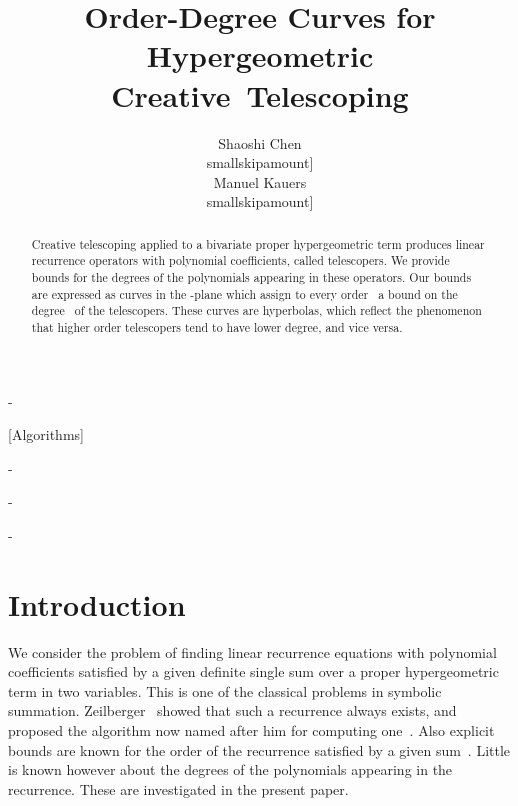 \documentclass{sig-alternate}
\begin{document}
\title{Order-Degree Curves for Hypergeometric Creative~Telescoping}


\author{\alignauthor Shaoshi Chen\\smallskipamount]
 \alignauthor \strut Manuel Kauers\\smallskipamount]
}

\maketitle
\begin{abstract}
    Creative telescoping applied to a bivariate proper hypergeometric term
    produces linear recurrence operators with polynomial coefficients, called
    telescopers. We provide bounds for the degrees of the polynomials appearing
    in these operators. Our bounds are expressed as curves in the {-plane}
    which assign to every order~ a bound on the degree~ of the telescopers. 
    These curves are hyperbolas, which reflect the phenomenon that higher order 
    telescopers tend to have lower degree, and vice versa.
\end{abstract}

\kern-\medskipamount

[Algorithms]

\kern-\medskipamount


\kern-\medskipamount


\kern-\medskipamount

\section{Introduction}

We consider the problem of finding linear recurrence equations with polynomial
coefficients satisfied by a given definite single sum over a proper
hypergeometric term in two variables. This is one of the classical problems
in symbolic summation. Zeilberger~\cite{zeilberger90} showed that such a
recurrence always exists, and proposed the algorithm now named after him for
computing one~\cite{zeilberger90a,zeilberger91}. Also explicit bounds are known
for the order of the recurrence satisfied by a given
sum~\cite{wilf92a,mohammed05,bostan10}. Little is known however about the
degrees of the polynomials appearing in the recurrence. These are investigated
in the present paper.
\end{document}
